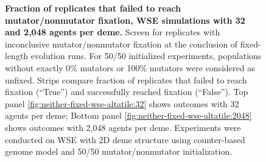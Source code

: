 \begin{figure}[h]
  \begin{minipage}{\textwidth}
    \caption{%
\textbf{Fraction of replicates that failed to reach mutator/nonmutator  fixation, WSE simulations with 32 and 2,048 agents per deme.}
\footnotesize
Screen for replicates with inconclusive mutator/nonmutator  fixation at the conclusion of fixed-length evolution runs.
For 50/50 initialized experiments, populations without exactly 0\% mutators or 100\% mutators were considered as unfixed.
Strips compare fraction of replicates that failed to reach fixation (``True'') and successfully reached fixation (``False'').
Top panel \ref{fig:neither-fixed-wse-altatile:32} shows outcomes with 32 agents per deme;
Bottom panel \ref{fig:neither-fixed-wse-altatile:2048} shows outcomes with 2,048 agents per deme.
Experiments were conducted on WSE with 2D deme structure using counter-based genome model and 50/50 mutator/nonmutator  initialization.
    }
    \label{fig:neither-fixed-wse-altatile}
  \end{minipage}
\end{figure}
